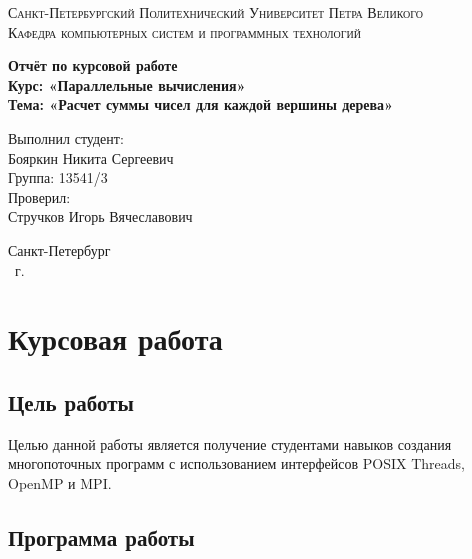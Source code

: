 \documentclass[14pt,a4paper,report]{report}
\begin{document}
\def\contentsname{Содержание}

\begin{titlepage}
	\begin{center}
		\textsc{Санкт-Петербургский Политехнический 
			Университет Петра Великого\\[5mm]
			Кафедра компьютерных систем и программных технологий}
		
		\vfill
		
		\textbf{Отчёт по курсовой работе\\[3mm]
			Курс: «Параллельные вычисления»\\[3mm]
			Тема: «Расчет суммы чисел для каждой вершины дерева»\\[35mm]
			}
	\end{center}
	
	\hfill
	\begin{minipage}{.5\textwidth}
		Выполнил студент:\\[2mm] 
		Бояркин Никита Сергеевич\\
		Группа: 13541/3\\[5mm]
		
		Проверил:\\[2mm] 
		Стручков Игорь Вячеславович
	\end{minipage}
	\vfill
	\begin{center}
		Санкт-Петербург\\ \the\year\ г.
	\end{center}
\end{titlepage}

\tableofcontents
\clearpage

\chapter{Курсовая работа}

\section{Цель работы}

Целью данной работы является получение студентами навыков создания многопоточных программ с использованием интерфейсов POSIX Threads, OpenMP и MPI.

\section{Программа работы}
\end{document}
